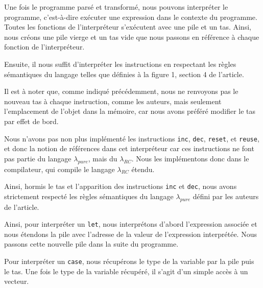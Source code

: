 \documentclass{rapportECL}
\begin{document}
Une fois le programme parsé et transformé, nous pouvons interpréter le programme, c'est-à-dire exécuter une expression dans le 
contexte du programme. Toutes les fonctions de l'interpréteur s'exécutent avec une pile et un tas. Ainsi, nous créons une pile vierge
et un tas vide que nous passons en référence à chaque fonction de l'interpréteur.

Ensuite, il nous suffit d'interpréter les instructions en respectant les règles sémantiques du langage telles que définies à la figure 1, section 4 de l'article\cite{ullrich_counting_2020}.



\medskip


Il est à noter que, comme indiqué précédemment, nous ne renvoyons pas le nouveau tas à chaque instruction, comme les auteurs, 
mais seulement l'emplacement de l'objet dans la mémoire, car nous avons préféré modifier le tas par effet de bord.

Nous n'avons pas non plus implémenté les instructions \verb|inc|, \verb|dec|, \verb|reset|, et \verb|reuse|, et donc la notion de références dans cet interpréteur car ces instructions ne font pas partie du langage $\lambda_{pure}$, mais du $\lambda_{RC}$.
Nous les implémentons donc dans le compilateur, qui compile le langage $\lambda_{RC}$ étendu.

Ainsi, hormis le tas et l'apparition des instructions \verb|inc| et \verb|dec|, nous avons strictement respecté les règles sémantiques du langage $\lambda_{pure}$ défini par les auteurs de l'article.

\medskip

Ainsi, pour interpréter un \verb|let|, nous interprétons d'abord l'expression associée et nous étendons la pile avec l'adresse de la valeur de l'expression interprétée. Nous passons cette nouvelle pile dans la suite du programme.


Pour interpréter un \verb|case|, nous récupérons le type de la variable par la pile puis le tas.
Une fois le type de la variable récupéré, il s'agit d'un simple accès à un vecteur.
\end{document}
